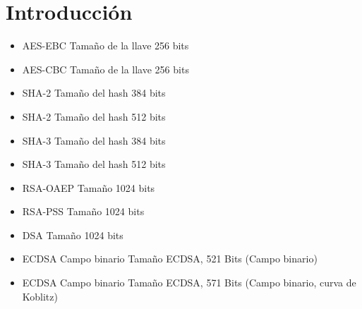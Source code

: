 \documentclass[../main.tex]{subfiles}
\begin{document}
\section{Introducción}\label{sec:introduccion}

\begin{itemize}
  \item AES-EBC
        Tamaño de la llave 256 bits

  \item AES-CBC
        Tamaño de la llave 256 bits

  \item SHA-2
        Tamaño del hash 384 bits

  \item SHA-2
        Tamaño del hash 512 bits

  \item SHA-3
        Tamaño del hash 384 bits

  \item SHA-3
        Tamaño del hash 512 bits

  \item RSA-OAEP
        Tamaño 1024 bits

  \item RSA-PSS
        Tamaño 1024 bits

  \item DSA
        Tamaño 1024 bits

  \item ECDSA Campo binario
        Tamaño ECDSA, 521 Bits (Campo binario)

  \item ECDSA Campo binario
        Tamaño ECDSA, 571 Bits (Campo binario, curva de Koblitz)
\end{itemize}
\end{document}
